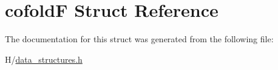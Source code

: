 \hypertarget{structcofoldF}{
\section{cofoldF Struct Reference}
\label{structcofoldF}
}


The documentation for this struct was generated from the following file:\begin{DoxyCompactItemize}
\item 
H/\hyperlink{data__structures_8h}{data\_\-structures.h}\end{DoxyCompactItemize}

